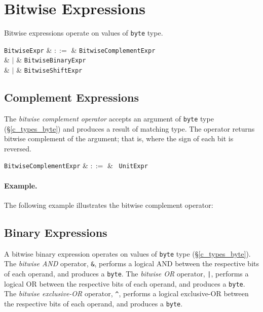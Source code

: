 \section{Bitwise Expressions}
\label{c_expr_bitwise}

Bitwise expressions operate on values of \lstinline{byte} type.

\begin{syntax}
  \verb+BitwiseExpr+ & $::=$ & \verb+BitwiseComplementExpr+\\
                  &  $|$  & \verb+BitwiseBinaryExpr+\\
                  &  $|$  & \verb+BitwiseShiftExpr+\\
\end{syntax}


\subsection{Complement Expressions}
\label{c_expr_bitwise_complement}
The {\em bitwise complement operator} accepts an argument of \lstinline{byte} type (\S\ref{c_types_byte}) and produces a result of matching type.  The operator returns bitwise complement of the argument; that is, where the sign of each bit is reversed.

\begin{syntax}
\verb+BitwiseComplementExpr+ & $::=$ & \token{$\sim$}\ \verb+UnitExpr+\\
\end{syntax}

\paragraph{Example.}  The following example illustrates the bitwise complement operator:



\subsection{Binary Expressions}
\label{c_expr_bitwise_binary}
A bitwise binary expression operates on values of \lstinline{byte} type (\S\ref{c_types_byte}).  The {\em bitwise AND} operator, \lstinline{&}, performs a logical AND between the respective bits of each operand, and produces a \lstinline{byte}.   The {\em bitwise OR} operator, \lstinline{|}, performs a logical OR between the respective bits of each operand, and produces a \lstinline{byte}.  The {\em bitwise exclusive-OR} operator, \lstinline{^}, performs a logical exclusive-OR between the respective bits of each operand, and produces a \lstinline{byte}.

